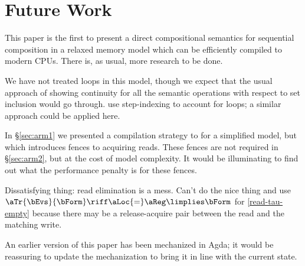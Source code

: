 \section{Future Work}

This paper is the first to present a direct compositional semantics for
sequential composition in a relaxed memory model which can be
efficiently compiled to modern CPUs. There is, as usual, more research
to be done.

We have not treated loops in this model, though we expect that the usual
approach of showing continuity for all the semantic operations with respect to set inclusion
would go through. \citet{DBLP:conf/esop/PaviottiCPWOB20} use step-indexing to account for
loops; a similar approach could be applied here.

In \S\ref{sec:arm1} we presented a compilation strategy to \armeight{}
for a simplified model, but which introduces fences to acquiring
reads. These fences are not required in \S\ref{sec:arm2}, but at the
cost of model complexity. It would be illuminating to find out what
the performance penalty is for these fences.

Dissatisfying thing: read elimination is a mess.  Can't do the nice thing and
use
\begin{math}
  \aTr{\bEvs}{\bForm} \riff \aLoc{=}\aReg \limplies \bForm
\end{math}
for \ref{read-tau-empty} because there may be a release-acquire pair between
the read and the matching write.

An earlier version of this paper has been mechanized in Agda; it would be
reassuring to update the mechanization to bring it in line with the current state.




